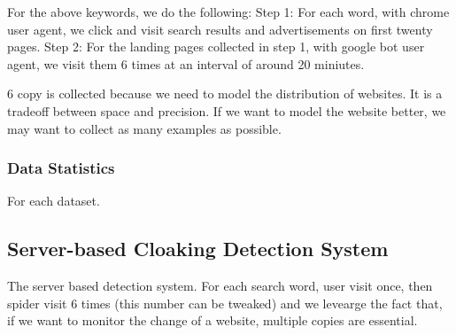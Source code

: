 For the above keywords, we do the following:
Step 1: For each word, with chrome user agent, we click and visit search results and advertisements on first
twenty pages.
Step 2: For the landing pages collected in step 1, with google bot user agent, we visit them 6 times at an
interval of around 20 miniutes.

6 copy is collected because we need to model the distribution of websites. It is
a tradeoff between space and precision. If we want to model the website better,
we may want to collect as many examples as possible.

\subsubsection{Data Statistics}

For each dataset.





\subsection{Server-based Cloaking Detection System}
The server based detection system.
For each search word, user visit once, then spider visit 6 times (this number
can be tweaked) and we levearge the fact that, if we want to monitor the change
of a website, multiple copies are essential.



